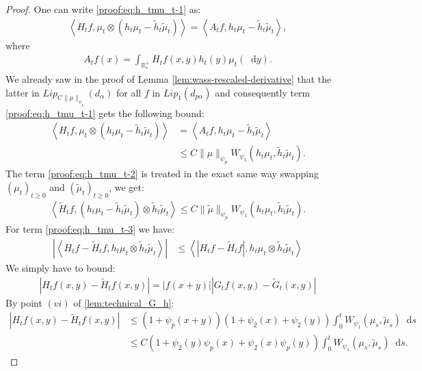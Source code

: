 \documentclass[11pt,a4paper]{article}
\newcommand{\RRP}{\mathbb{R}^+_*}
\newcommand{\Proc}[1]{\left(#1\right)_{t\geq 0}}
\newcommand{\brac}[1]{\left\langle#1\right\rangle}
\newcommand{\dd}{\mathop{}\!\mathrm{d}}
\begin{document}
\begin{proof}
    One can write \eqref{proof:eq:h_tmu_t-1} as:
    \begin{align*}
        \brac{H_tf,\mu_t \otimes\left(h_t\mu_t -  \tilde{h}_t \tilde{\mu}_t\right)} = \brac{A_tf,h_t\mu_t -  \tilde{h}_t \tilde{\mu}_t},
    \end{align*}
    where
    \begin{align*}
        A_tf(x) = \int_{\RRP} H_tf(x,y) h_t(y)\mu_t(\dd y).
    \end{align*}
    We already saw in the proof of Lemma \ref{lem:wass-rescaled-derivative} that the latter in $Lip_{C\|\mu\|_{\psi_{p}}}(d_{\alpha})$ for all $f$ in $Lip_1(d_{p\alpha})$ and consequently term \eqref{proof:eq:h_tmu_t-1} gets the following bound:
    \begin{align*}
        \brac{H_tf,\mu_t \otimes\left(h_t\mu_t -  \tilde{h}_t \tilde{\mu}_t\right)} &= \brac{A_tf,h_t\mu_t -  \tilde{h}_t \tilde{\mu}_t}\\
        &\leq C\| \mu\|_{\psi_{p}} W_{\psi_1}(h_t\mu_t, \tilde{h}_t \tilde{\mu}_t).
    \end{align*}
    The term \eqref{proof:eq:h_tmu_t-2} is treated in the exact same way swapping $\Proc{\mu_t}$ and $\Proc{\tilde{\mu}_t}$, we get:
    \begin{align*}
        \brac{\tilde{H}_tf,\left(h_t\mu_t-\tilde{h}_t\tilde{\mu}_t\right) \otimes \tilde{h}_t \tilde{\mu}_t} \leq C\| \tilde{\mu}\|_{\psi_{p}} W_{\psi_1}(h_t\mu_t, \tilde{h}_t \tilde{\mu}_t).
    \end{align*} 
    For term \eqref{proof:eq:h_tmu_t-3} we have:
    \begin{align*}
        \left|\brac{H_tf - \tilde{H}_tf,h_t\mu_t \otimes \tilde{h}_t \tilde{\mu}_t}\right| &\leq \brac{\left|H_tf - \tilde{H}_tf\right|,h_t\mu_t \otimes  \tilde{h}_t \tilde{\mu}_t} 
    \end{align*}
    We simply have to bound:
    \begin{align*}
        \left|H_tf(x,y) - \tilde{H}_tf(x,y)\right| = |f(x+y)|\left|G_tf(x,y) - \tilde{G}_t(x,y)\right|
    \end{align*}
    By point $(vi)$ of \ref{lem:technical_G_h}:
    \begin{align*}
        \left|H_tf(x,y) - \tilde{H}_tf(x,y)\right| &\leq \left(1 + \psi_{p}(x + y) \right)\left(1 + \psi_{2}(x) + \psi_{2}(y) \right)\int_0^t W_{\psi_1}(\mu_s,\tilde{\mu}_s)\dd s\\
        &\leq C \left(1 +  \psi_{2}(y)\psi_{p}(x) +  \psi_{2}(x)\psi_{p}(y) \right)\int_0^t W_{\psi_1}(\mu_s,\tilde{\mu}_s)\dd s.

\end{align*}
\end{proof}
\end{document}
